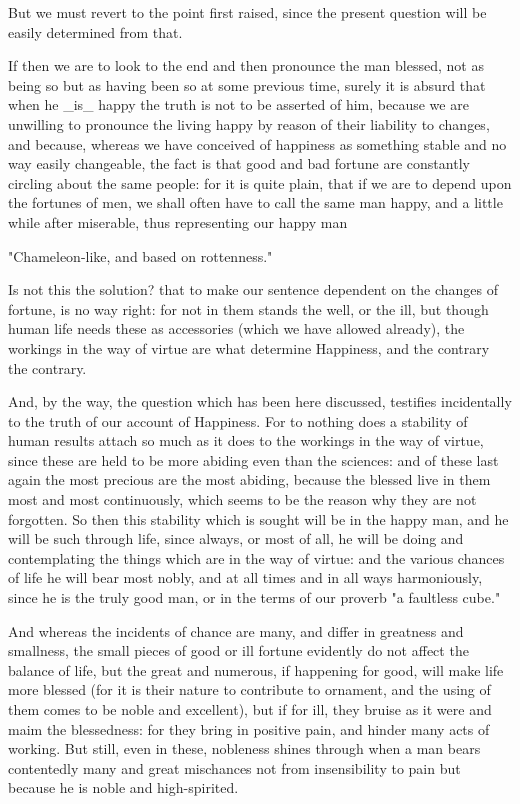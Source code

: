 But we must revert to the point first raised, since the present question
will be easily determined from that.

If then we are to look to the end and then pronounce the man blessed,
not as being so but as having been so at some previous time, surely it
is absurd that when he _is_ happy the truth is not to be asserted of
him, because we are unwilling to pronounce the living happy by reason of
their liability to changes, and because, whereas we have conceived of
happiness as something stable and no way easily changeable, the fact is
that good and bad fortune are constantly circling about the same people:
for it is quite plain, that if we are to depend upon the fortunes of
men, we shall often have to call the same man happy, and a little while
after miserable, thus representing our happy man

  "Chameleon-like, and based on rottenness."

Is not this the solution? that to make our sentence dependent on the
changes of fortune, is no way right: for not in them stands the well, or
the ill, but though human life needs these as accessories (which we have
allowed already), the workings in the way of virtue are what determine
Happiness, and the contrary the contrary.

And, by the way, the question which has been here discussed, testifies
incidentally to the truth of our account of Happiness. For to nothing
does a stability of human results attach so much as it does to the
workings in the way of virtue, since these are held to be more abiding
even than the sciences: and of these last again the most precious
are the most abiding, because the blessed live in them most and most
continuously, which seems to be the reason why they are not forgotten.
So then this stability which is sought will be in the happy man, and
he will be such through life, since always, or most of all, he will be
doing and contemplating the things which are in the way of virtue: and
the various chances of life he will bear most nobly, and at all times
and in all ways harmoniously, since he is the truly good man, or in the
terms of our proverb "a faultless cube."

And whereas the incidents of chance are many, and differ in greatness
and smallness, the small pieces of good or ill fortune evidently do not
affect the balance of life, but the great and numerous, if happening for
good, will make life more blessed (for it is their nature to contribute
to ornament, and the using of them comes to be noble and excellent), but
if for ill, they bruise as it were and maim the blessedness: for they
bring in positive pain, and hinder many acts of working. But still, even
in these, nobleness shines through when a man bears contentedly many and
great mischances not from insensibility to pain but because he is noble
and high-spirited.

